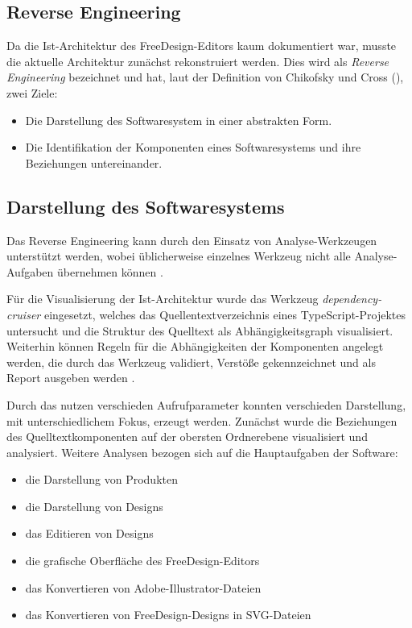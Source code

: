 \subsection{Reverse Engineering}
Da die Ist-Architektur des FreeDesign-Editors kaum dokumentiert war, musste die aktuelle Architektur zunächst rekonstruiert werden. 
Dies wird als \emph{Reverse Engineering} bezeichnet und hat, laut der Definition von Chikofsky und Cross (\citeyear[S. 13-17]{Chikofsky1990}), zwei Ziele: 
\begin{itemize}
    \item Die Darstellung des Softwaresystem in einer abstrakten Form. 
    \item Die Identifikation der Komponenten eines Softwaresystems und ihre Beziehungen untereinander. 
\end{itemize}


\subsection{Darstellung des Softwaresystems}
Das Reverse Engineering kann durch den Einsatz von Analyse-Werkzeugen unterstützt werden, wobei üblicherweise einzelnes Werkzeug nicht alle Analyse-Aufgaben übernehmen können \autocite[vgl.][381]{Bass2013}.  

Für die Visualisierung der Ist-Architektur wurde das Werkzeug \emph{dependency-cruiser} eingesetzt, welches das Quellentextverzeichnis eines TypeScript-Projektes untersucht und die Struktur des Quelltext als Abhängigkeitsgraph visualisiert. Weiterhin können Regeln für die Abhängigkeiten der Komponenten angelegt werden, die durch das Werkzeug validiert, Verstöße gekennzeichnet und als Report ausgeben werden \autocite[vgl.][]{Verweij:Dependency}. 

Durch das nutzen verschieden Aufrufparameter konnten verschieden Darstellung, mit unterschiedlichem Fokus, erzeugt werden.
Zunächst wurde die Beziehungen des Quelltextkomponenten auf der obersten Ordnerebene visualisiert und analysiert. 
Weitere Analysen bezogen sich auf die Hauptaufgaben der Software:
\begin{itemize}
    \item die Darstellung von Produkten
    \item die Darstellung von Designs
    \item das Editieren von Designs
    \item die grafische Oberfläche des FreeDesign-Editors
    \item das Konvertieren von Adobe-Illustrator-Dateien
    \item das Konvertieren von FreeDesign-Designs in SVG-Dateien
\end{itemize}

